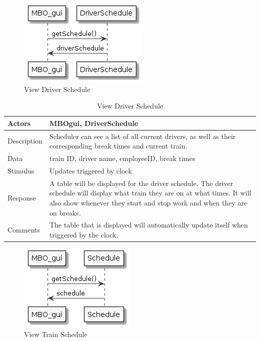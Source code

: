 \documentclass[]{article}
\begin{document}
	\begin{figure}[H]
		\centering
		\includegraphics{viewDriverSched.png}
		\caption{View Driver Schedule}
	\end{figure}
	
	\begin{table}[H]
		\centering
		\caption{View Driver Schedule}
		\begin{tabular}{|l|l|}
			\hline
			Actors & \parbox[t]{10cm}{MBOgui, DriverSchedule} \\ \hline
			Description & \parbox[t]{10cm}{Scheduler can see a list of all current drivers, as well as their corresponding break times and current train. } \\ \hline
			Data &  \parbox[t]{10cm}{train ID, driver name, employeeID, break times} \\ \hline
			Stimulus &  \parbox[t]{10cm}{Updates triggered by clock} \\ \hline
			Response & \parbox[t]{10cm}{A table will be displayed for the driver schedule. The driver schedule will display what train they are on at what times. It will also show whenever they start and stop work and when they are on breaks.}\\ \hline
			Comments & \parbox[t]{10cm}{The table that is displayed will automatically update itself when triggered by the clock.}  \\ \hline
		\end{tabular}
	\end{table}
	
	\begin{figure}[H]
		\centering
		\includegraphics{viewSchedule.png}
		\caption{View Train Schedule}
	\end{figure}
	
\end{document}
